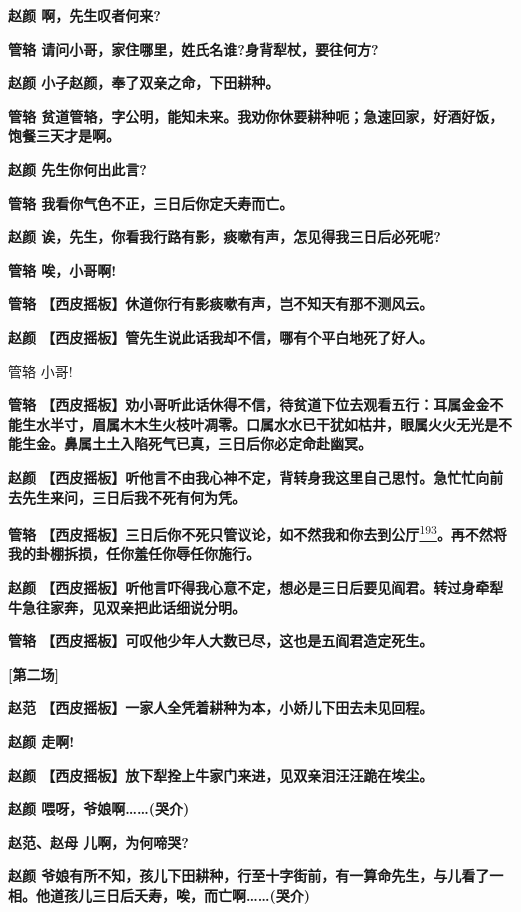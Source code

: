 \textbf{赵颜 啊，先生叹者何来?}

\textbf{管辂 请问小哥，家住哪里，姓氏名谁?身背犁杖，要往何方?}

\textbf{赵颜 小子赵颜，奉了双亲之命，下田耕种。}

\textbf{管辂
贫道管辂，字公明，能知未来。我劝你休要耕种呃；急速回家，好酒好饭，饱餐三天才是啊。}

\textbf{赵颜 先生你何出此言?}

\textbf{管辂 我看你气色不正，三日后你定夭寿而亡。}

\textbf{赵颜 诶，先生，你看我行路有影，痰嗽有声，怎见得我三日后必死呢?}

\textbf{管辂 唉，小哥啊!}

\textbf{管辂 【西皮摇板】休道你行有影痰嗽有声，岂不知天有那不测风云。}

\textbf{赵颜 【西皮摇板】管先生说此话我却不信，哪有个平白地死了好人。}

管辂 小哥!

\textbf{管辂
【西皮摇板】劝小哥听此话休得不信，待贫道下位去观看五行：耳属金金不能生水半寸，眉属木木生火枝叶凋零。口属水水已干犹如枯井，眼属火火无光是不能生金。鼻属土土入陷死气已真，三日后你必定命赴幽冥。}

\textbf{赵颜
【西皮摇板】听他言不由我心神不定，背转身我这里自己思忖。急忙忙向前去先生来问，三日后我不死有何为凭。}

\textbf{管辂
【西皮摇板】三日后你不死只管议论，如不然我和你去到公厅}\protect\hyperlink{fn193}{\textsuperscript{193}}\textbf{。再不然将我的卦棚拆损，任你羞任你辱任你施行。}

\textbf{赵颜
【西皮摇板】听他言吓得我心意不定，想必是三日后要见阎君。转过身牵犁牛急往家奔，见双亲把此话细说分明。}

\textbf{管辂 【西皮摇板】可叹他少年人大数已尽，这也是五阎君造定死生。}

\textbf{{[}第二场{]}}

\textbf{赵范 【西皮摇板】一家人全凭着耕种为本，小娇儿下田去未见回程。}

\textbf{赵颜 走啊!}

\textbf{赵颜 【西皮摇板】放下犁拴上牛家门来进，见双亲泪汪汪跪在埃尘。}

\textbf{赵颜 喂呀，爷娘啊\ldots{}\ldots{}(哭介)}

\textbf{赵范、赵母 儿啊，为何啼哭?}

\textbf{赵颜
爷娘有所不知，孩儿下田耕种，行至十字街前，有一算命先生，与儿看了一相。他道孩儿三日后夭寿，唉，而亡啊\ldots{}\ldots{}(哭介)}

